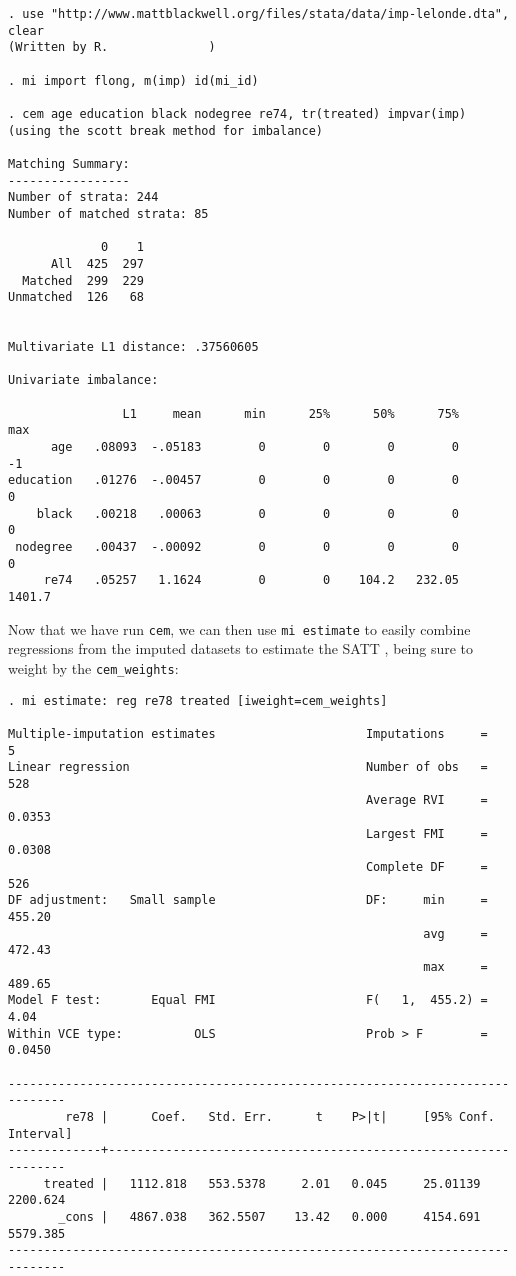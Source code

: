 \documentclass[11pt,titlepage]{article}
\begin{document}
\begin{verbatim}
. use "http://www.mattblackwell.org/files/stata/data/imp-lelonde.dta", clear
(Written by R.              )

. mi import flong, m(imp) id(mi_id)

. cem age education black nodegree re74, tr(treated) impvar(imp)
(using the scott break method for imbalance)

Matching Summary:
-----------------
Number of strata: 244
Number of matched strata: 85

             0    1
      All  425  297
  Matched  299  229
Unmatched  126   68


Multivariate L1 distance: .37560605

Univariate imbalance:

                L1     mean      min      25%      50%      75%      max
      age   .08093  -.05183        0        0        0        0       -1
education   .01276  -.00457        0        0        0        0        0
    black   .00218   .00063        0        0        0        0        0
 nodegree   .00437  -.00092        0        0        0        0        0
     re74   .05257   1.1624        0        0    104.2   232.05   1401.7
\end{verbatim}
Now that we have run \texttt{cem}, we can then use \texttt{mi
  estimate} to easily combine regressions from the imputed datasets to
estimate the SATT \citep{KinHonJos01}, being sure to weight by the
\texttt{cem\_weights}:
\begin{verbatim}
. mi estimate: reg re78 treated [iweight=cem_weights]

Multiple-imputation estimates                     Imputations     =          5
Linear regression                                 Number of obs   =        528
                                                  Average RVI     =     0.0353
                                                  Largest FMI     =     0.0308
                                                  Complete DF     =        526
DF adjustment:   Small sample                     DF:     min     =     455.20
                                                          avg     =     472.43
                                                          max     =     489.65
Model F test:       Equal FMI                     F(   1,  455.2) =       4.04
Within VCE type:          OLS                     Prob > F        =     0.0450

------------------------------------------------------------------------------
        re78 |      Coef.   Std. Err.      t    P>|t|     [95% Conf. Interval]
-------------+----------------------------------------------------------------
     treated |   1112.818   553.5378     2.01   0.045     25.01139    2200.624
       _cons |   4867.038   362.5507    13.42   0.000     4154.691    5579.385
------------------------------------------------------------------------------

\end{verbatim}
\end{document}
